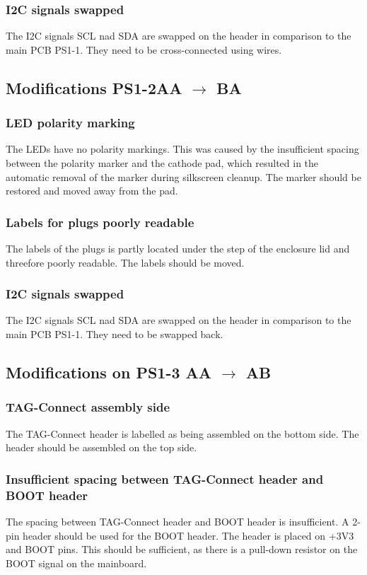 \subsubsection{\acs{I2C} signals swapped}
The \ac{I2C} signals SCL nad SDA are swapped on the header in comparison to the main PCB PS1-1. They need to be cross-connected using wires. 

\subsection{Modifications PS1-2AA $\to$ BA}

\subsubsection{LED polarity marking}
The LEDs have no polarity markings. This was caused by the insufficient spacing between the polarity marker and the cathode pad, which resulted in the automatic removal of the marker during silkscreen cleanup. The marker should be restored and moved away from the pad. 

\subsubsection{Labels for plugs poorly readable}
The labels of the plugs is partly located under the step of the enclosure lid and threefore poorly readable. The labels should be moved. 

\subsubsection{\acs{I2C} signals swapped}
The \ac{I2C} signals SCL nad SDA are swapped on the header in comparison to the main PCB PS1-1. They need to be swapped back. 

\subsection{Modifications on PS1-3 AA $\to$ AB}

\subsubsection{TAG-Connect assembly side}
The TAG-Connect header is labelled as being assembled on the bottom side. The header should be assembled on the top side. 

\subsubsection{Insufficient spacing between TAG-Connect header and BOOT header}
The spacing between TAG-Connect header and BOOT header is insufficient. A 2-pin header should be used for the BOOT header. The header is placed on +3V3 and BOOT pins. This should be sufficient, as there is a pull-down resistor on the BOOT signal on the mainboard. 

